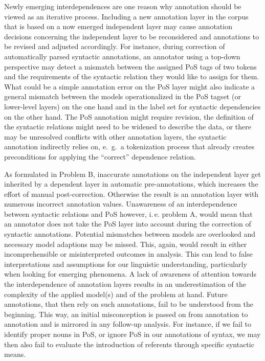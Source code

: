 \documentclass[output=paper,colorlinks,citecolor=brown]{langscibook}
\begin{document}
Newly emerging interdependences are one reason why annotation should be viewed as an iterative process. Including a new annotation layer in the corpus that is based on a now emerged independent layer may cause annotation decisions concerning the independent layer to be reconsidered and annotations to be revised and adjusted accordingly. For instance, during correction of automatically parsed syntactic annotations, an annotator using a top-down perspective may detect a mismatch between the assigned PoS tags of two tokens and the requirements of the syntactic relation they would like to assign for them. What could be a simple annotation error on the PoS layer might also indicate a general mismatch between the models operationalized in the PoS tagset (or lower-level layers) on the one hand and in the label set for syntactic dependencies on the other hand. The PoS annotation might require revision, the definition of the syntactic relations might need to be widened to describe the data, or there may be unresolved conflicts with other annotation layers, the syntactic annotation indirectly relies on, e.~g.\ a tokenization process that already creates preconditions for applying the “correct” dependence relation.

As formulated in Problem B, inaccurate annotations on the independent layer get inherited by a dependent layer in automatic pre-annotations, which increases the effort of manual post-correction. Otherwise the result is an annotation layer with numerous incorrect annotation values. Unawareness of an interdependence between syntactic relations and PoS however, i.\,e. problem A, would mean that an annotator does not take the PoS layer into account during the correction of syntactic annotations. Potential mismatches between models are overlooked and necessary model adaptions may be missed. This, again, would result in either incomprehensible or misinterpreted outcomes in analysis. This can lead to false interpretations and assumptions for our linguistic understanding, particularly when looking for emerging phenomena. A lack of awareness of attention towards the interdependence of annotation layers results in an underestimation of the complexity of the applied model(s) and of the problem at hand. Future annotations, that then rely on such annotations, fail to be understood from the beginning. This way, an initial misconception is passed on from annotation to annotation and is mirrored in any follow-up analysis. For instance, if we fail to identify proper nouns in PoS, or ignore PoS in our annotations of syntax, we may then also fail to evaluate the introduction of referents through specific syntactic means.
\end{document}
